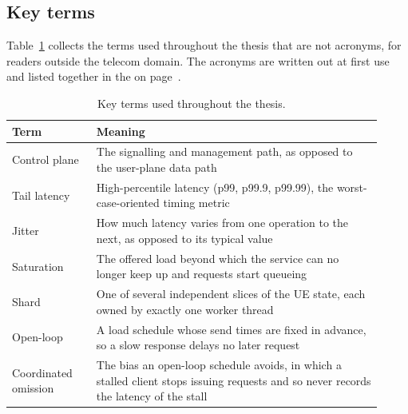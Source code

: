 \documentclass[english,oneside,a4paper,censored,csm,software-track-2020]{HYthesisML}
\renewcommand{\arraystretch}{0.95}
\begin{document}
\backmatter
\begin{appendices}

\section{Key terms\label{appendix:terms}}
Table~\ref{tab:abbrev} collects the terms used throughout the thesis that are not acronyms, for
readers outside the telecom domain. The acronyms are written out at first use and listed together
in the \nomname{} on page~\pageref{page:acronyms}.

\begin{table}[H]
\centering
\caption[Key terms]{Key terms used throughout the thesis.\label{tab:abbrev}}
\singlespacing
\footnotesize
\renewcommand{\arraystretch}{1.2}
\begin{tabular}{@{}p{0.21\linewidth} p{0.71\linewidth}@{}}
\hline\hline
Term & Meaning \\
\hline
Control plane & The signalling and management path, as opposed to the user-plane data path \\
Tail latency & High-percentile latency (p99, p99.9, p99.99), the worst-case-oriented timing metric \\
Jitter & How much latency varies from one operation to the next, as opposed to its typical value \\
Saturation & The offered load beyond which the service can no longer keep up and requests start queueing \\
Shard & One of several independent slices of the UE state, each owned by exactly one worker thread \\
Open-loop & A load schedule whose send times are fixed in advance, so a slow response delays no later request \\
Coordinated omission & The bias an open-loop schedule avoids, in which a stalled client stops issuing requests and so never records the latency of the stall \\
\hline
\end{tabular}
\end{table}


\end{appendices}
\end{document}
